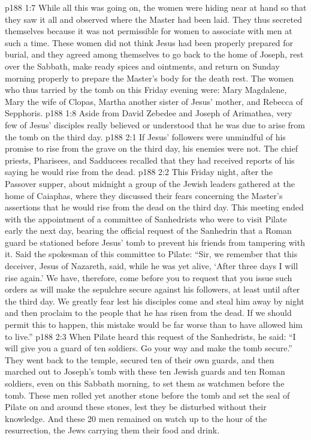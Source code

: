 \vs p188 1:7 While all this was going on, the women were hiding near at hand so that they saw it all and observed where the Master had been laid. They thus secreted themselves because it was not permissible for women to associate with men at such a time. These women did not think Jesus had been properly prepared for burial, and they agreed among themselves to go back to the home of Joseph, rest over the Sabbath, make ready spices and ointments, and return on Sunday morning properly to prepare the Master’s body for the death rest. The women who thus tarried by the tomb on this Friday evening were: Mary Magdalene, Mary the wife of Clopas, Martha another sister of Jesus’ mother, and Rebecca of Sepphoris.
\vs p188 1:8 Aside from David Zebedee and Joseph of Arimathea, very few of Jesus’ disciples really believed or understood that he was due to arise from the tomb on the third day.
\vs p188 2:1 If Jesus’ followers were unmindful of his promise to rise from the grave on the third day, his enemies were not. The chief priests, Pharisees, and Sadducees recalled that they had received reports of his saying he would rise from the dead.
\vs p188 2:2 This Friday night, after the Passover supper, about midnight a group of the Jewish leaders gathered at the home of Caiaphas, where they discussed their fears concerning the Master’s assertions that he would rise from the dead on the third day. This meeting ended with the appointment of a committee of Sanhedrists who were to visit Pilate early the next day, bearing the official request of the Sanhedrin that a Roman guard be stationed before Jesus’ tomb to prevent his friends from tampering with it. Said the spokesman of this committee to Pilate: “Sir, we remember that this deceiver, Jesus of Nazareth, said, while he was yet alive, ‘After three days I will rise again.’ We have, therefore, come before you to request that you issue such orders as will make the sepulchre secure against his followers, at least until after the third day. We greatly fear lest his disciples come and steal him away by night and then proclaim to the people that he has risen from the dead. If we should permit this to happen, this mistake would be far worse than to have allowed him to live.”
\vs p188 2:3 When Pilate heard this request of the Sanhedrists, he said: “I will give you a guard of ten soldiers. Go your way and make the tomb secure.” They went back to the temple, secured ten of their own guards, and then marched out to Joseph’s tomb with these ten Jewish guards and ten Roman soldiers, even on this Sabbath morning, to set them as watchmen before the tomb. These men rolled yet another stone before the tomb and set the seal of Pilate on and around these stones, lest they be disturbed without their knowledge. And these 20 men remained on watch up to the hour of the resurrection, the Jews carrying them their food and drink.
